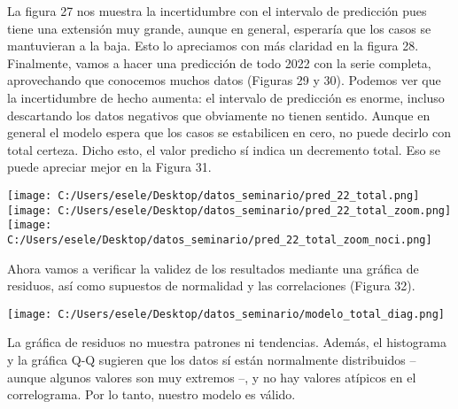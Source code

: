 \documentclass[11pt,letterpaper]{article}
\theoremstyle{definition}
\theoremstyle{theorem}
\theoremstyle{remark}
\begin{document}
	\indent La figura 27 nos muestra la incertidumbre con el intervalo de predicción pues tiene una extensión muy grande, aunque en general, esperaría que los casos se mantuvieran a la baja. Esto lo apreciamos con más claridad en la figura 28. Finalmente, vamos a hacer una predicción de todo 2022 con la serie completa, aprovechando que conocemos muchos datos (Figuras 29 y 30). Podemos ver que la incertidumbre de hecho aumenta: el intervalo de predicción es enorme, incluso descartando los datos negativos que obviamente no tienen sentido. Aunque en general el modelo espera que los casos se estabilicen en cero, no puede decirlo con total certeza. Dicho esto, el valor predicho sí indica un decremento total. Eso se puede apreciar mejor en la Figura 31.
	\begin{center}
		\texttt{[image: C:/Users/esele/Desktop/datos\_seminario/pred\_22\_total.png]}
		\texttt{[image: C:/Users/esele/Desktop/datos\_seminario/pred\_22\_total\_zoom.png]}
		\texttt{[image: C:/Users/esele/Desktop/datos\_seminario/pred\_22\_total\_zoom\_noci.png]}
	\end{center}
	\par Ahora vamos a verificar la validez de los resultados mediante una gráfica de residuos, así como supuestos de normalidad y las correlaciones (Figura 32).
	\begin{center}
		\hspace*{-1em}\texttt{[image: C:/Users/esele/Desktop/datos\_seminario/modelo\_total\_diag.png]}
	\end{center}
	\par La gráfica de residuos no muestra patrones ni tendencias. Además, el histograma y la gráfica Q-Q sugieren que los datos sí están normalmente distribuidos -- aunque algunos valores son muy extremos --, y no hay valores atípicos en el correlograma. Por lo tanto, nuestro modelo es válido.
	\clearpage
\end{document}
